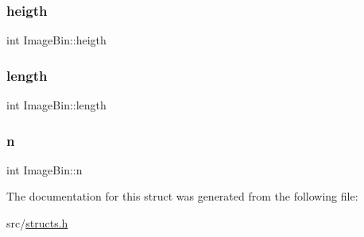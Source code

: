 \subsubsection{\texorpdfstring{heigth}{heigth}}
{\footnotesize\ttfamily int Image\+Bin\+::heigth}

\mbox{\label{structImageBin_a9ef9ab5f89fcb7e82ad84a8c0c537add}} 
\subsubsection{\texorpdfstring{length}{length}}
{\footnotesize\ttfamily int Image\+Bin\+::length}

\mbox{\label{structImageBin_a7ca58eb8b2e6c7de6698a2596bd1ab59}} 
\subsubsection{\texorpdfstring{n}{n}}
{\footnotesize\ttfamily int Image\+Bin\+::n}



The documentation for this struct was generated from the following file\+:\begin{DoxyCompactItemize}
\item 
src/\hyperlink{structs_8h}{structs.\+h}\end{DoxyCompactItemize}
